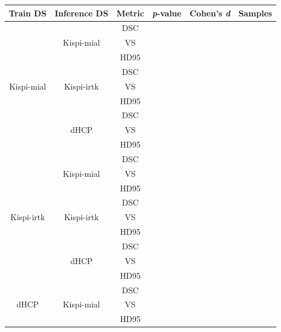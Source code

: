 \begin{table}[htbp]
    \centering
    \begin{tabular}{c|c|c|c|c|c}
        \toprule
        \textbf{Train DS} & \textbf{Inference DS} & \textbf{Metric} & \textbf{\textit{p}-value} & \textbf{Cohen's \textit{d}} & \textbf{Samples} \\
        \midrule
        \multirow{9}{*}{Kispi-mial}
            & \multirow{3}{*}{Kispi-mial} & DSC  &  &  &  \\
            &                             & VS   &  &  &  \\
            &                             & HD95 &  &  &  \\
        \hhline{~-----}
            & \multirow{3}{*}{Kispi-irtk} & DSC  &  &  &  \\
            &                             & VS   &  &  &  \\
            &                             & HD95 &  &  &  \\
        \hhline{~-----}
            & \multirow{3}{*}{dHCP} & DSC  &  &  &  \\
            &                       & VS   &  &  &  \\
            &                       & HD95 &  &  &  \\
        \hline
        \multirow{9}{*}{Kispi-irtk}
            & \multirow{3}{*}{Kispi-mial} & DSC  &  &  &  \\
            &                             & VS   &  &  &  \\
            &                             & HD95 &  &  &  \\
        \hhline{~-----}
            & \multirow{3}{*}{Kispi-irtk} & DSC  &  &  &  \\
            &                             & VS   &  &  &  \\
            &                             & HD95 &  &  &  \\
        \hhline{~-----}
            & \multirow{3}{*}{dHCP} & DSC  &  &  &  \\
            &                       & VS   &  &  &  \\
            &                       & HD95 &  &  &  \\
        \hline
        \multirow{9}{*}{dHCP}
            & \multirow{3}{*}{Kispi-mial} & DSC  &  &  &  \\
            &                             & VS   &  &  &  \\
            &                             & HD95 &  &  &  \\

\end{tabular}
\end{table}

